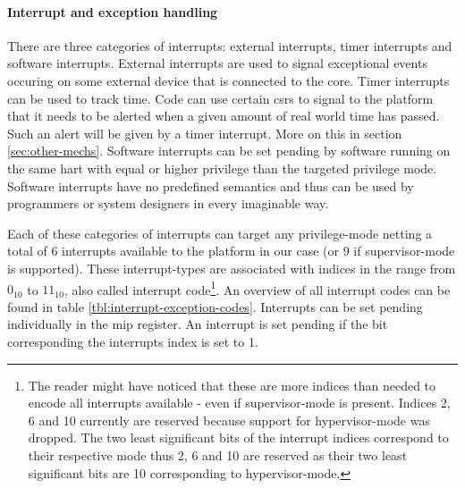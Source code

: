\paragraph{Interrupt and exception handling}
There are three categories of interrupts: external interrupts, timer interrupts and software interrupts.
External interrupts are used to signal exceptional events occuring on some external device that is connected to the core.
Timer interrupts can be used to track time.
Code can use certain \glspl{csr} to signal to the platform that it needs to be alerted when a given amount of real world time has passed.
Such an alert will be given by a timer interrupt.
More on this in section \ref{sec:other-mechs}.
Software interrupts can be set pending by software running on the same \gls{hart} with equal or higher privilege than the targeted privilege mode.
Software interrupts have no predefined semantics and thus can be used by programmers or system designers in every imaginable way.

Each of these categories of interrupts can target any privilege-mode netting a total of 6 interrupts available to the platform in our case (or 9 if supervisor-mode is supported).
These interrupt-types are associated with indices in the range from $ 0_{10} $ to $ 11_{10} $, also called interrupt code\footnote{%
    The reader might have noticed that these are more indices than needed to encode all interrupts available - even if supervisor-mode is present.
    Indices 2, 6 and 10 currently are reserved because support for hypervisor-mode was dropped.
    The two least significant bits of the interrupt indices correspond to their respective mode thus 2, 6 and 10 are reserved as their two least significant bits are 10 corresponding to hypervisor-mode.
}.
An overview of all interrupt codes can be found in table \ref{tbl:interrupt-exception-codes}.
Interrupts can be set pending individually in the \gls{mip} register.
An interrupt is set pending if the bit corresponding the interrupts index is set to 1.

